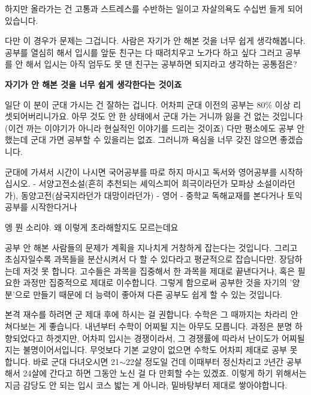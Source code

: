 하지만 올라가는 건 고통과 스트레스를 수반하는 일이고 자살의욕도 수십번 들게 되어있습니다.
\vspace{5mm}

다만 이 경우가 문제는 그겁니다. 사람은 자기가 안 해본 것을 너무 쉽게 생각해봅니다.
공부를 열심히 해서 입시를 앞둔 친구는 다 때려치우고 노가다 하고 싶다 그러고
공부를 안 해서 입시는 아직 엄두도 못 댄 친구는 공부하면 되지라고 생각하는 공통점은?
\vspace{5mm}

\textbf{자기가 안 해본 것을 너무 쉽게 생각한다는 것이죠}
\vspace{5mm}

일단 이 분이 군대 가시는 건 잘하는 겁니다. 어차피 군대 이전의 공부는 80$\%$ 이상 리셋되어버리니가요.
아무 것도 안 한 상태에서 군대 가는 거니까 잃을 건 없는 것입니다(이건 까는 이야기가 아니라 현실적인 이야기를 드리는 것이죠)
다만 평소에도 공부 안 했는데 군대 가면 공부할 수 있을리는 없죠. 그러니까 욕심을 너무 갖진 않으면 좋겠습니다.
\vspace{5mm}

군대에 가셔서 시간이 나시면 국어공부를 따로 하지 마시고 독서와 영어공부를 시작하십시오.
- 서양고전소설(흔히 추천되는 셰익스피어 희극이라던가 모파상 소설이라던가), 동양고전(삼국지라던가 대망이라던가)
- 영어 - 중학교 독해교재를 본다거나 토익공부를 시작한다거나
\vspace{5mm}

엥 뭔 소리야. 왜 이렇게 초라해할지도 모르는데요
\vspace{5mm}

공부 안 해본 사람들의 문제가 계획을 지나치게 거창하게 잡는다는 것입니다.
그리고 초심자일수록 과목들을 분산시켜서 다 할 수 있다라고 평균적으로 잡습니다만. 장담하는데 저것 못 합니다.
고수들은 과목을 집중해서 한 과목을 제대로 끝낸다거나, 혹은 필요한 과정만 집중적으로 제대로 이수합니다.
그렇게 함으로써 공부한 것을 자기의 '양분'으로 만들기 때문에 더 능력이 좋아져 다른 공부도 쉽게 할 수 있는 것입니다.
\vspace{5mm}

본격 재수를 하려면 군 제대 후에 하시는 걸 권합니다.
수학은 그 때까지는 차라리 안 쳐다보는 게 좋습니다. 내년부터 수학이 어찌될 지는 아무도 모릅니다.
과정은 분명 하향되었다고 하겟지만, 어차피 입시는 경쟁이라서, 그 경쟁률에 따라서 난이도가 어찌될지는 불명이어서입니다.
무엇보다 기본 교양이 없으면 수학도 어차피 제대로 공부 못 합니다.
바로 군대 다녀오시면 21$\sim$22살 정도일 건데 이때부터 정신차리고 2년간 공부해서 24살에 간다고 하면 그동안 노신 걸 다 만회할 수는 있겠죠.
이렇게 하기 위해서는 지금 감당도 안 되는 입시 코스 밟는 게 아니라, 밑바탕부터 제대로 쌓아야합니다.
\vspace{5mm}

